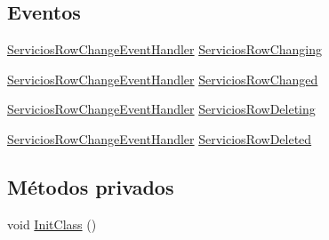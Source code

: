 \subsection*{Eventos}
\begin{DoxyCompactItemize}
\item 
\hyperlink{class_proyecto___integrador__3_1_1ds_servicios_a12a7c95915227392e001d214be4c6c58}{Servicios\-Row\-Change\-Event\-Handler} \hyperlink{class_proyecto___integrador__3_1_1ds_servicios_1_1_servicios_data_table_ab12bdec8a4cc5c92777d020c5f26cb10}{Servicios\-Row\-Changing}
\item 
\hyperlink{class_proyecto___integrador__3_1_1ds_servicios_a12a7c95915227392e001d214be4c6c58}{Servicios\-Row\-Change\-Event\-Handler} \hyperlink{class_proyecto___integrador__3_1_1ds_servicios_1_1_servicios_data_table_a0e8a3232436341c5724f8eb74ecd976d}{Servicios\-Row\-Changed}
\item 
\hyperlink{class_proyecto___integrador__3_1_1ds_servicios_a12a7c95915227392e001d214be4c6c58}{Servicios\-Row\-Change\-Event\-Handler} \hyperlink{class_proyecto___integrador__3_1_1ds_servicios_1_1_servicios_data_table_a59d056a91ad2ab4905fbe239ff440f9d}{Servicios\-Row\-Deleting}
\item 
\hyperlink{class_proyecto___integrador__3_1_1ds_servicios_a12a7c95915227392e001d214be4c6c58}{Servicios\-Row\-Change\-Event\-Handler} \hyperlink{class_proyecto___integrador__3_1_1ds_servicios_1_1_servicios_data_table_a7b2809ac1c63557531a1ae77eceb8805}{Servicios\-Row\-Deleted}
\end{DoxyCompactItemize}
\subsection*{Métodos privados}
\begin{DoxyCompactItemize}
\item 
void \hyperlink{class_proyecto___integrador__3_1_1ds_servicios_1_1_servicios_data_table_a0e603fcb88e1b87c41b87693443ee7f5}{Init\-Class} ()
\end{DoxyCompactItemize}
